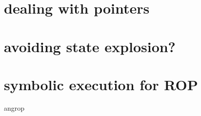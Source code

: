 \section{dealing with pointers}


\section{avoiding state explosion?}

\section{symbolic execution for ROP}
\begin{frame}{angrop}
\end{frame}

